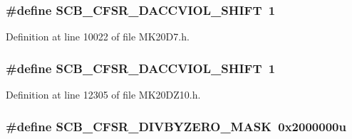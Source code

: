 \subsubsection[{\texorpdfstring{S\+C\+B\+\_\+\+C\+F\+S\+R\+\_\+\+D\+A\+C\+C\+V\+I\+O\+L\+\_\+\+S\+H\+I\+FT}{SCB_CFSR_DACCVIOL_SHIFT}}]{\setlength{\rightskip}{0pt plus 5cm}\#define S\+C\+B\+\_\+\+C\+F\+S\+R\+\_\+\+D\+A\+C\+C\+V\+I\+O\+L\+\_\+\+S\+H\+I\+FT~1}\hypertarget{group___s_c_b___register___masks_gad841ce29e85066f38861d1c3fc338096}{}\label{group___s_c_b___register___masks_gad841ce29e85066f38861d1c3fc338096}


Definition at line 10022 of file M\+K20\+D7.\+h.

\subsubsection[{\texorpdfstring{S\+C\+B\+\_\+\+C\+F\+S\+R\+\_\+\+D\+A\+C\+C\+V\+I\+O\+L\+\_\+\+S\+H\+I\+FT}{SCB_CFSR_DACCVIOL_SHIFT}}]{\setlength{\rightskip}{0pt plus 5cm}\#define S\+C\+B\+\_\+\+C\+F\+S\+R\+\_\+\+D\+A\+C\+C\+V\+I\+O\+L\+\_\+\+S\+H\+I\+FT~1}\hypertarget{group___s_c_b___register___masks_gad841ce29e85066f38861d1c3fc338096}{}\label{group___s_c_b___register___masks_gad841ce29e85066f38861d1c3fc338096}


Definition at line 12305 of file M\+K20\+D\+Z10.\+h.

\subsubsection[{\texorpdfstring{S\+C\+B\+\_\+\+C\+F\+S\+R\+\_\+\+D\+I\+V\+B\+Y\+Z\+E\+R\+O\+\_\+\+M\+A\+SK}{SCB_CFSR_DIVBYZERO_MASK}}]{\setlength{\rightskip}{0pt plus 5cm}\#define S\+C\+B\+\_\+\+C\+F\+S\+R\+\_\+\+D\+I\+V\+B\+Y\+Z\+E\+R\+O\+\_\+\+M\+A\+SK~0x2000000u}\hypertarget{group___s_c_b___register___masks_gad8ad002c8204ce09b7a3e3a74b0048be}{}\label{group___s_c_b___register___masks_gad8ad002c8204ce09b7a3e3a74b0048be}


